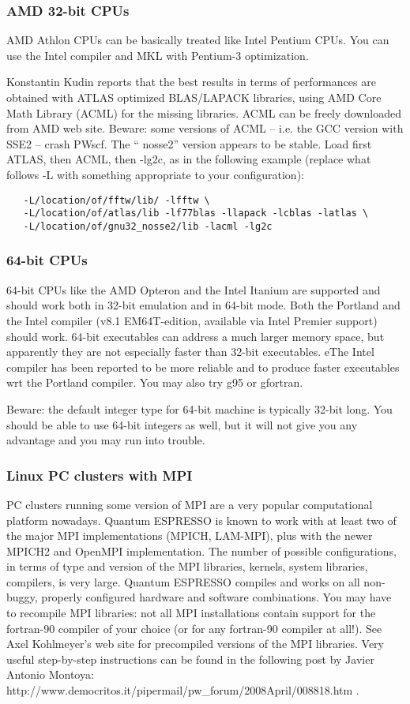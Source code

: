 \documentclass[12pt,a4paper]{article}
\begin{document}
\subsubsection{AMD 32-bit CPUs}
AMD Athlon CPUs can be basically treated like Intel Pentium CPUs. You
can use the Intel compiler and MKL with Pentium-3 optimization.

Konstantin Kudin reports that the best results in terms of performances
are obtained with ATLAS optimized BLAS/LAPACK libraries, using AMD
Core Math Library (ACML) for the missing libraries. ACML can be freely
downloaded from AMD web site. Beware: some versions of ACML – i.e.
the GCC version with SSE2 – crash PWscf. The “ nosse2” version appears
to be stable. Load first ATLAS, then ACML, then -lg2c, as in the
following example (replace what follows -L with something appropriate
to your configuration):
  \begin{verbatim}
   -L/location/of/fftw/lib/ -lfftw \
   -L/location/of/atlas/lib -lf77blas -llapack -lcblas -latlas \
   -L/location/of/gnu32_nosse2/lib -lacml -lg2c
\end{verbatim}

\subsubsection{64-bit CPUs}
64-bit CPUs like the AMD Opteron and the Intel Itanium are supported and
should work both in 32-bit emulation and in 64-bit mode. Both the Portland
and the Intel compiler (v8.1 EM64T-edition, available via Intel
Premier support) should work. 64-bit executables can address a much
larger memory space, but apparently they are not especially faster
than 32-bit executables. 
eThe Intel compiler has been reported to be more reliable and to produce
faster executables wrt the Portland compiler. You may also try g95 or gfortran.

Beware: the default integer type for 64-bit machine is typically
32-bit long. You should be able to use 64-bit integers as well, 
but it will not give you any advantage and you may run into trouble.

\subsubsection{Linux PC clusters with MPI}
PC clusters running some version of MPI are a very popular
computational platform nowadays. Quantum ESPRESSO is known to work
with at least two of the major MPI implementations (MPICH, LAM-MPI),
plus with the newer MPICH2 and OpenMPI implementation. The number of
possible configurations, in terms of type and version of the MPI
libraries, kernels, system libraries, compilers, is very
large. Quantum ESPRESSO compiles and works on all non-buggy, properly
conﬁgured hardware and software combinations. You may have to
recompile MPI libraries: not all MPI installations contain support for
the fortran-90 compiler of your choice (or for any fortran-90 compiler
at all!).  See Axel Kohlmeyer's web site for precompiled versions of
the MPI libraries.  Very useful step-by-step instructions can be found
in the following post by  Javier Antonio Montoya:\\
http://www.democritos.it/pipermail/pw\_forum/2008April/008818.htm . 
\end{document}
